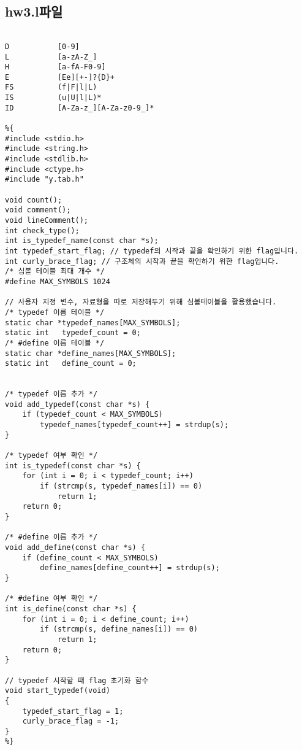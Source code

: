 \documentclass[11pt,oneside,a4paper]{article}
\begin{document}
\subsection{hw3.l파일}
\begin{verbatim} 

D			[0-9]
L			[a-zA-Z_]
H			[a-fA-F0-9]
E			[Ee][+-]?{D}+
FS			(f|F|l|L)
IS			(u|U|l|L)*
ID    		[A-Za-z_][A-Za-z0-9_]*

%{
#include <stdio.h>
#include <string.h>
#include <stdlib.h>
#include <ctype.h>
#include "y.tab.h"

void count();
void comment();
void lineComment();
int check_type();
int is_typedef_name(const char *s);
int typedef_start_flag; // typedef의 시작과 끝을 확인하기 위한 flag입니다.
int curly_brace_flag; // 구조체의 시작과 끝을 확인하기 위한 flag입니다.
/* 심볼 테이블 최대 개수 */
#define MAX_SYMBOLS 1024

// 사용자 지정 변수, 자료형을 따로 저장해두기 위해 심볼테이블을 활용했습니다.
/* typedef 이름 테이블 */
static char *typedef_names[MAX_SYMBOLS];
static int   typedef_count = 0;
/* #define 이름 테이블 */
static char *define_names[MAX_SYMBOLS];
static int   define_count = 0;
 

/* typedef 이름 추가 */
void add_typedef(const char *s) {
    if (typedef_count < MAX_SYMBOLS)
        typedef_names[typedef_count++] = strdup(s);
}

/* typedef 여부 확인 */
int is_typedef(const char *s) {
    for (int i = 0; i < typedef_count; i++)
        if (strcmp(s, typedef_names[i]) == 0)
            return 1;
    return 0;
}

/* #define 이름 추가 */
void add_define(const char *s) {
    if (define_count < MAX_SYMBOLS)
        define_names[define_count++] = strdup(s);
}

/* #define 여부 확인 */
int is_define(const char *s) {
    for (int i = 0; i < define_count; i++)
        if (strcmp(s, define_names[i]) == 0)
            return 1;
    return 0;
}

// typedef 시작할 때 flag 초기화 함수
void start_typedef(void)
{
	typedef_start_flag = 1; 
	curly_brace_flag = -1; 
}
%}



\end{verbatim}
\end{document}
